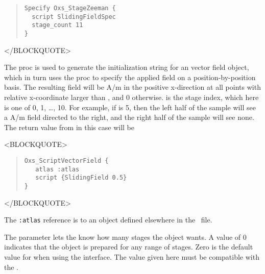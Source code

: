 \begin{description}
\begin{quote}
\begin{verbatim}
Specify Oxs_StageZeeman {
  script SlidingFieldSpec
  stage_count 11
}
\end{verbatim}
\end{quote}
\begin{rawhtml}
</BLOCKQUOTE>
\end{rawhtml}

   The  proc is used to generate the initialization
   string for an  vector field object, which
   in turn uses the  proc to specify the applied field
   on a position-by-position basis.  The resulting field will be
    A/m in the positive x-direction at
   all points with relative x-coordinate larger than ,
   and 0 otherwise.   is the stage index, which here is
   one of 0, 1, \ldots, 10.  For example, if  is 5, then the
   left half of the sample will see a 
   A/m field directed to the right, and the right half of the sample
   will see none.  The return value from  in this
   case will be
\begin{rawhtml}
<BLOCKQUOTE>
\end{rawhtml}
\begin{quote}
\begin{verbatim}
Oxs_ScriptVectorField {
   atlas :atlas
   script {SlidingField 0.5}
}
\end{verbatim}
\end{quote}
\begin{rawhtml}
</BLOCKQUOTE>
\end{rawhtml}
   The \verb+:atlas+ reference is to an  object defined
   elsewhere in the \MIF\ file.

   The  parameter lets the
    know how many stages the
    object wants.  A value of 0 indicates that the
   object is prepared for any range of stages.  Zero is the default
   value for  when using the 
   interface.  The  value given here must be compatible
   with the .



\end{description}
